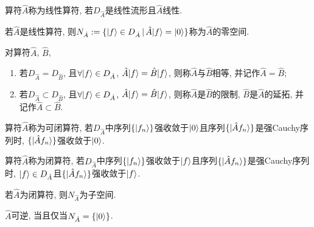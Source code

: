 \begin{definition}
    算符$\hat{A}$称为线性算符, 若$D_{\hat{A}}$是线性流形且$\hat{A}$线性.
\end{definition}
\begin{definition}
    若$\hat{A}$是线性算符, 则$N_{\hat{A}}:=\{|f\rangle\in D_{\hat{A}}\,|\,\hat{A}|f\rangle=|0\rangle\}$称为$\hat{A}$的零空间.
\end{definition}
\begin{definition}
    对算符$\hat{A}$, $\hat{B}$, 
    \begin{enumerate}
        \item 若$D_{\hat{A}}=D_{\hat{B}}$, 且$\forall|f\rangle\in D_{\hat{A}}$, $\hat{A}|f\rangle=\hat{B}|f\rangle$, 则称$\hat{A}$与$\hat{B}$相等, 并记作$\hat{A}=\hat{B}$;
        \item 若$D_{\hat{A}}\subset D_{\hat{B}}$, 且$\forall|f\rangle\in D_{\hat{A}}$, $\hat{A}|f\rangle=\hat{B}|f\rangle$, 则称$\hat{A}$是$\hat{B}$的限制, $\hat{B}$是$\hat{A}$的延拓, 并记作$\hat{A}\subset\hat{B}$.
    \end{enumerate}
\end{definition}
\begin{definition}
    算符$\hat{A}$称为可闭算符, 若$D_{\hat{A}}$中序列$\{|f_n\rangle\}$强收敛于$|0\rangle$且序列$\{|\hat{A}f_n\rangle\}$是强Cauchy序列时, $\{|\hat{A}f_n\rangle\}$强收敛于$|0\rangle$.
\end{definition}
\begin{definition}
    算符$\hat{A}$称为闭算符, 若$D_{\hat{A}}$中序列$\{|f_n\rangle\}$强收敛于$|f\rangle$且序列$\{|\hat{A}f_n\rangle\}$是强Cauchy序列时, $|f\rangle\in D_{\hat{A}}$且$\{|\hat{A}f_n\rangle\}$强收敛于$|f\rangle$.
\end{definition}
\begin{theorem}
    若$\hat{A}$为闭算符, 则$N_{\hat{A}}$为子空间.
\end{theorem}
\begin{theorem}
    $\hat{A}$可逆, 当且仅当$N_{\hat{A}}=\{|0\rangle\}$.
\end{theorem}


